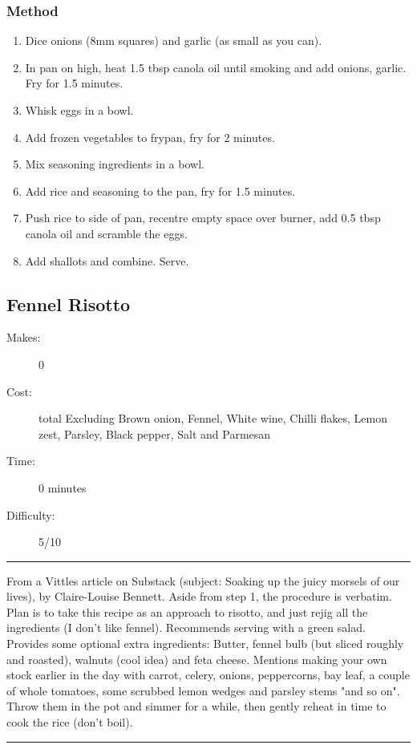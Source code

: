 \documentclass[]{article}
\begin{document}
\subsubsection*{\Large Method}
\begin{enumerate}[font=\huge\color{accent}]
	\item Dice onions (8mm squares) and garlic (as small as you can).
	\item In pan on high, heat 1.5 tbsp canola oil until smoking and add onions, garlic. Fry for 1.5 minutes.
	\item Whisk eggs in a bowl.
	\item Add frozen vegetables to frypan, fry for 2 minutes.
	\item Mix seasoning ingredients in a bowl.
	\item Add rice and seasoning to the pan, fry for 1.5 minutes.
	\item Push rice to side of pan, recentre empty space over burner, add 0.5 tbsp canola oil and scramble the eggs.
	\item Add shallots and combine. Serve.
\end{enumerate}
\newpage
{}\label{rec:Fennel Risotto}
\subsection*{\center\huge Fennel Risotto}
\begin{description}
\item[Makes:] 0 
\item[Cost:]  total Excluding Brown onion, Fennel, White wine, Chilli flakes, Lemon zest, Parsley, Black pepper, Salt and Parmesan
\item[Time:] 0 minutes
\item[Difficulty:] 5/10
\end{description}
\vspace{0.2cm}\hrule\vspace{0.5cm}
\begin{adjustwidth}{0.5 cm}{0.5 cm}

From a Vittles article on Substack (subject: Soaking up the juicy morsels of our lives), by Claire-Louise Bennett. Aside from step 1, the procedure is verbatim. Plan is to take this recipe as an approach to risotto, and just rejig all the ingredients (I don't like fennel). Recommends serving with a green salad. Provides some optional extra ingredients: Butter, fennel bulb (but sliced roughly and roasted), walnuts (cool idea) and feta cheese. Mentions making your own stock earlier in the day with carrot, celery, onions, peppercorns, bay leaf, a couple of whole tomatoes, some scrubbed lemon wedges and parsley stems "and so on". Throw them in the pot and simmer for a while, then gently reheat in time to cook the rice (don't boil). \hfill\color{accent}{\Large\faVimeoSquare\hspace{0.1cm}\faGlide\hspace{0.1cm}}\color{black}

\end{adjustwidth}
\vspace{0.5cm}\hrule
\end{document}
